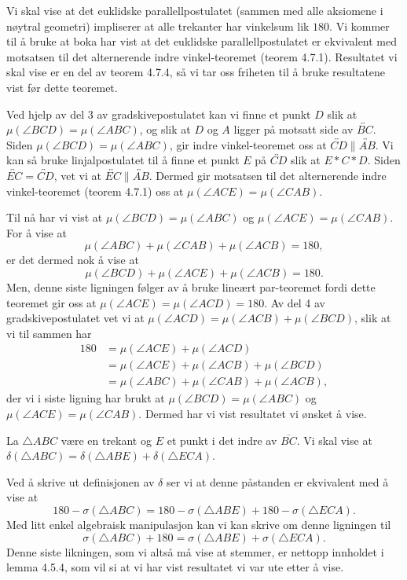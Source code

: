 \begin{oppgave}[4.7.6]
    Vi skal vise at det euklidske parallellpostulatet (sammen med alle aksiomene i nøytral geometri) impliserer at alle trekanter har vinkelsum lik $180$. 
    Vi kommer til å bruke at boka har vist at det euklidske parallellpostulatet er ekvivalent med motsatsen til det alternerende indre vinkel-teoremet (teorem 4.7.1).
    Resultatet vi skal vise er en del av teorem 4.7.4, så vi tar oss friheten til å bruke resultatene vist før dette teoremet. 

    Ved hjelp av del 3 av gradskivepostulatet kan vi finne et punkt $D$ slik at $\mu(\angle BCD)=\mu(\angle ABC)$, og slik at $D$ og $A$ ligger på motsatt side av $\overleftrightarrow{BC}$. 
    Siden $\mu(\angle BCD) = \mu(\angle ABC)$, gir indre vinkel-teoremet oss at $\overleftrightarrow{CD}\parallel \overleftrightarrow{AB}$. 
    Vi kan så bruke linjalpostulatet til å finne et punkt $E$ på $\overleftrightarrow{CD}$ slik at $E\ast C\ast D$. 
    Siden $\overleftrightarrow{EC}=\overleftrightarrow{CD}$, vet vi at $\overleftrightarrow{EC}\parallel \overleftrightarrow{AB}$. 
    Dermed gir motsatsen til det alternerende indre vinkel-teoremet (teorem 4.7.1) oss at $\mu(\angle ACE)=\mu(\angle CAB)$. 

    Til nå har vi vist at $\mu(\angle BCD)=\mu(\angle ABC)$ og $\mu(\angle ACE)=\mu(\angle CAB)$. 
    For å vise at 
    $$\mu(\angle ABC)+\mu(\angle CAB)+\mu(\angle ACB)=180,$$
    er det dermed nok å vise at 
    $$\mu(\angle BCD)+\mu(\angle ACE)+\mu(\angle ACB)=180.$$
    Men, denne siste ligningen følger av å bruke lineært par-teoremet fordi dette teoremet gir oss at $\mu(\angle ACE)=\mu(\angle ACD)=180$. 
    Av del 4 av gradskivepostulatet vet vi at $\mu(\angle ACD)=\mu(\angle ACB)+\mu(\angle BCD)$, slik at vi til sammen har 
    \begin{align*}
        180 
        &= \mu(\angle ACE)+\mu(\angle ACD) \\
        &= \mu(\angle ACE)+\mu(\angle ACB)+\mu(\angle BCD) \\
        &= \mu(\angle ABC)+\mu(\angle CAB)+\mu(\angle ACB), 
    \end{align*}
    der vi i siste ligning har brukt at $\mu(\angle BCD)=\mu(\angle ABC)$ og $\mu(\angle ACE)=\mu(\angle CAB)$. 
    Dermed har vi vist resultatet vi ønsket å vise. 
\end{oppgave}

\begin{oppgave}[4.8.1]
    La $\triangle ABC$ være en trekant og $E$ et punkt i det indre av $\overline{BC}$. 
    Vi skal vise at $\delta(\triangle ABC)=\delta(\triangle ABE)+\delta(\triangle ECA)$. 

    Ved å skrive ut definisjonen av $\delta$ ser vi at denne påstanden er ekvivalent med å vise at 
    $$180 - \sigma(\triangle ABC) = 180-\sigma(\triangle ABE)+180-\sigma(\triangle ECA).$$
    Med litt enkel algebraisk manipulasjon kan vi kan skrive om denne ligningen til
    $$\sigma(\triangle ABC)+180 = \sigma(\triangle ABE)+\sigma(\triangle ECA).$$
    Denne siste likningen, som vi altså må vise at stemmer, er nettopp innholdet i lemma 4.5.4, som vil si at vi har vist resultatet vi var ute etter å vise. 
\end{oppgave}

